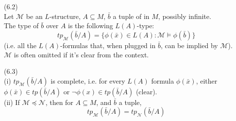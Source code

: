 \documentclass[a4paper]{article}
\begin{document}
\begin{defi} (6.2)\\
    Let $\mathcal{M}$ be an $L$-structure, $A \subseteq M$, $\bar{b}$ a tuple of in $M$, possibly infinite.\\
    The type of $\bar{b}$ over $A$ is the following $L(A)$-type:
    $$tp_\mathcal{M}(\bar{b}/A) = \{\phi(\bar{x}) \in L(A): \mathcal{M} \vDash \phi(\bar{b})\}$$
    (i.e. all the $L(A)$-formulas that, when plugged in $\bar{b}$, can be implied by $\mathcal{M}$).\\
    $\mathcal{M}$ is often omitted if it's clear from the context.
\end{defi}

\begin{rem} (6.3)\\
    (i) $tp_{\mathcal{M}} (\bar{b}/A)$ is complete, i.e. for every $L(A)$ formula $\phi(\bar{x})$, either $\phi(\bar{x}) \in tp(\bar{b}/A)$ or $\neg\phi(x) \in tp(\bar{b}/A)$ (clear).\\
    (ii) If $\mathcal{M} \preccurlyeq\mathcal{N}$, then for $A \subseteq M$, and $\bar{b}$ a tuple,
    $$tp_\mathcal{M}(\bar{b}/A) = tp_\mathcal{N}(\bar{b}/A)$$
\end{rem}
\end{document}
